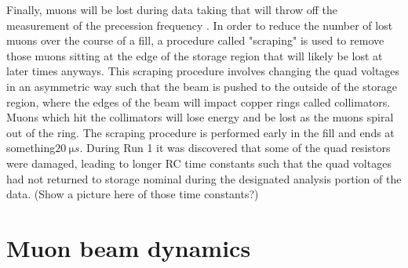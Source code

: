 Finally, muons will be lost during data taking that will throw off the measurement of the precession frequency \wa. In order to reduce the number of lost muons over the course of a fill, a procedure called "scraping" is used to remove those muons sitting at the edge of the storage region that will likely be lost at later times anyways. This scraping procedure involves changing the quad voltages in an asymmetric way such that the beam is pushed to the outside of the storage region, where the edges of the beam will impact copper rings called collimators. Muons which hit the collimators will lose energy and be lost as the muons spiral out of the ring. The scraping procedure is performed early in the fill and ends at something$\SI{20}{\micro s}$. During Run 1 it was discovered that some of the quad resistors were damaged, leading to longer RC time constants such that the quad voltages had not returned to storage nominal during the designated analysis portion of the data. (Show a picture here of those time constants?)




\section{Muon beam dynamics}
\label{sec:muonbeamdynamics}

